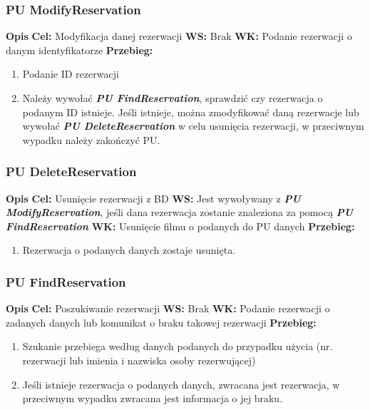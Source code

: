 \documentclass{article}
\begin{document}
	\subsubsection{PU ModifyReservation}
	\noindent \textbf{Opis}
	\newline \textbf{Cel: } Modyfikacja danej rezerwacji
	\newline \textbf{WS: } Brak
	\newline \textbf{WK: } Podanie rezerwacji o danym identyfikatorze
	\newline \textbf{Przebieg: }
	\begin{enumerate}
		\item Podanie ID rezerwacji
		\item Należy wywołać \textit{\textbf{PU FindReservation}}, sprawdzić czy rezerwacja o podanym ID istnieje. Jeśli istnieje, można zmodyfikować daną rezerwacje lub wywołać \textit{\textbf{PU DeleteReservation}} w celu usunięcia rezerwacji, w przeciwnym wypadku należy zakończyć PU.
	\end{enumerate}
	
	\subsubsection{PU DeleteReservation}
	\noindent \textbf{Opis}
	\newline \textbf{Cel:} Usunięcie rezerwacji z BD
	\newline \textbf{WS: } Jest wywoływany z \textit{\textbf{PU ModifyReservation}}, jeśli dana rezerwacja zostanie znaleziona za pomocą \textit{\textbf{PU FindReservation}}
	\newline \textbf{WK: } Usunięcie filmu o podanych do PU danych
	\newline \textbf{Przebieg: }
	\begin{enumerate}
		\item Rezerwacja o podanych danych zostaje usunięta.
	\end{enumerate}
	
	\subsubsection{PU FindReservation}
	\noindent \textbf{Opis }
	\newline \textbf{Cel: } Poszukiwanie rezerwacji
	\newline \textbf{WS:} Brak
	\newline \textbf{WK: } Podanie rezerwacji o zadanych danych lub komunikat o braku takowej rezerwacji
	\newline \textbf{Przebieg: }
	\begin{enumerate}
		\item Szukanie przebiega według danych podanych do przypadku użycia (nr. rezerwacji lub imienia i nazwiska osoby rezerwującej)
		\item Jeśli istnieje rezerwacja o podanych danych, zwracana jest rezerwacja, w przeciwnym wypadku zwracana jest informacja o jej braku.
	\end{enumerate}
	
\end{document}
